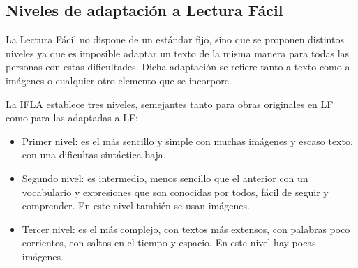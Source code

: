 

\subsection{Niveles de adaptación a Lectura Fácil}
La Lectura Fácil no dispone de un estándar fijo, sino que se proponen distintos niveles ya que es imposible adaptar un texto de la misma manera para todas las personas con estas dificultades. Dicha adaptación se refiere tanto a texto como a imágenes o cualquier otro elemento que se incorpore.

La IFLA establece tres niveles, semejantes
tanto para obras originales en LF como para las adaptadas a LF:
\begin{itemize}
	\item Primer nivel: es el más sencillo y simple con muchas imágenes y escaso texto, con una dificultas sintáctica baja.
	\item Segundo nivel: es intermedio, menos sencillo que el anterior con un vocabulario y expresiones que son conocidas por todos, fácil de seguir y comprender. En este nivel también se usan imágenes.
	\item Tercer nivel: es el más complejo, con textos más extensos, con palabras poco corrientes, con saltos en el tiempo y espacio. En este nivel hay pocas imágenes.
\end{itemize}

